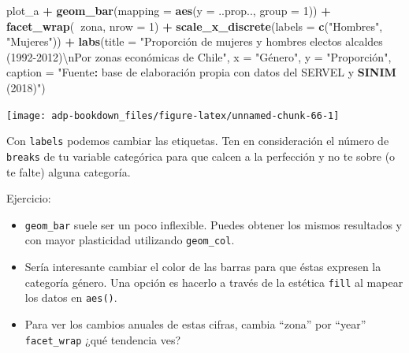 \documentclass[]{book}
\newenvironment{Shaded}{\begin{snugshade}}{\end{snugshade}}
\newcommand{\CharTok}[1]{\textcolor[rgb]{0.31,0.60,0.02}{#1}}
\newcommand{\DataTypeTok}[1]{\textcolor[rgb]{0.13,0.29,0.53}{#1}}
\newcommand{\DecValTok}[1]{\textcolor[rgb]{0.00,0.00,0.81}{#1}}
\newcommand{\KeywordTok}[1]{\textcolor[rgb]{0.13,0.29,0.53}{\textbf{#1}}}
\newcommand{\NormalTok}[1]{#1}
\newcommand{\OperatorTok}[1]{\textcolor[rgb]{0.81,0.36,0.00}{\textbf{#1}}}
\newcommand{\StringTok}[1]{\textcolor[rgb]{0.31,0.60,0.02}{#1}}
\providecommand{\tightlist}{%
  \setlength{\itemsep}{0pt}\setlength{\parskip}{0pt}}
\begin{document}
\begin{Shaded}
\begin{Highlighting}[]
\NormalTok{plot_a }\OperatorTok{+}\StringTok{ }
\StringTok{  }\KeywordTok{geom_bar}\NormalTok{(}\DataTypeTok{mapping =} \KeywordTok{aes}\NormalTok{(}\DataTypeTok{y =}\NormalTok{ ..prop.., }\DataTypeTok{group =} \DecValTok{1}\NormalTok{)) }\OperatorTok{+}
\StringTok{  }\KeywordTok{facet_wrap}\NormalTok{(}\OperatorTok{~}\NormalTok{zona, }\DataTypeTok{nrow =} \DecValTok{1}\NormalTok{) }\OperatorTok{+}
\StringTok{  }\KeywordTok{scale_x_discrete}\NormalTok{(}\DataTypeTok{labels =} \KeywordTok{c}\NormalTok{(}\StringTok{"Hombres"}\NormalTok{, }\StringTok{"Mujeres"}\NormalTok{)) }\OperatorTok{+}
\StringTok{  }\KeywordTok{labs}\NormalTok{(}\DataTypeTok{title =} \StringTok{"Proporción de mujeres y hombres electos alcaldes (1992-2012)}\CharTok{\textbackslash{}n}\StringTok{Por zonas económicas de Chile"}\NormalTok{, }
       \DataTypeTok{x =} \StringTok{"Género"}\NormalTok{, }\DataTypeTok{y =} \StringTok{"Proporción", }
\StringTok{       caption = "}\NormalTok{Fuente}\OperatorTok{:}\StringTok{ }\NormalTok{base de elaboración propia con datos del SERVEL y }\KeywordTok{SINIM}\NormalTok{ (}\DecValTok{2018}\NormalTok{)}\StringTok{") }
\end{Highlighting}
\end{Shaded}

\begin{center}\texttt{[image: adp-bookdown\_files/figure-latex/unnamed-chunk-66-1]} \end{center}

Con \texttt{labels} podemos cambiar las etiquetas. Ten en consideración
el número de \texttt{breaks} de tu variable categórica para que calcen a
la perfección y no te sobre (o te falte) alguna categoría.

Ejercicio:

\begin{itemize}
\tightlist
\item
  \texttt{geom\_bar} suele ser un poco inflexible. Puedes obtener los
  mismos resultados y con mayor plasticidad utilizando
  \texttt{geom\_col}.
\item
  Sería interesante cambiar el color de las barras para que éstas
  expresen la categoría género. Una opción es hacerlo a través de la
  estética \texttt{fill} al mapear los datos en \texttt{aes()}.
\item
  Para ver los cambios anuales de estas cifras, cambia ``zona'' por
  ``year'' \texttt{facet\_wrap} ¿qué tendencia ves?
\end{itemize}
\end{document}
